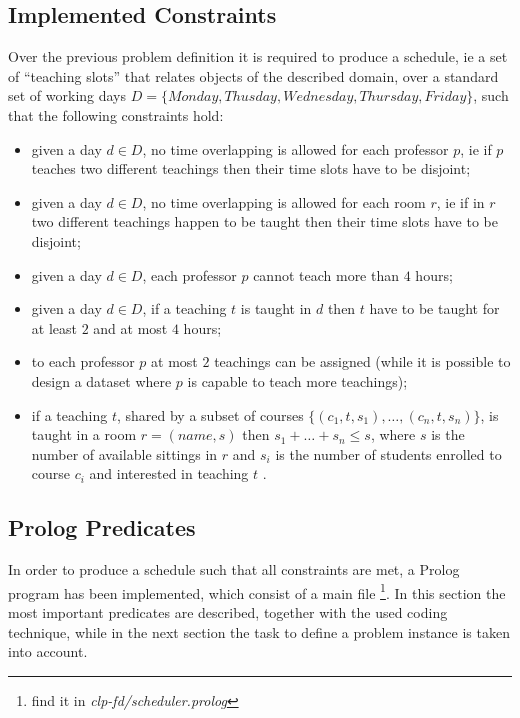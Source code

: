 \documentclass[10pt,a4paper]{article} %
\begin{document}
    \subsection{Implemented Constraints}
    Over the previous problem definition it is required to produce a
    schedule, ie a set of ``teaching slots'' that relates
    objects of the described domain, over a standard set of
    working days $D = \lbrace Monday, Thusday, Wednesday, Thursday, Friday \rbrace$,
    such that the following constraints hold:
    \begin{itemize}
        \item given a day $d \in D$, no time overlapping is allowed
            for each professor $p$,
            ie if $p$ teaches two different teachings then their time slots
            have to be disjoint;
        \item given a day $d \in D$, no time overlapping is allowed
            for each room $r$,
            ie if in $r$ two different teachings happen to be taught then
            their time slots have to be disjoint;
        \item given a day $d \in D$, each professor $p$ cannot teach more than
           $4$ hours;
        \item given a day $d \in D$, if a teaching $t$ is taught in $d$ then
            $t$ have to be taught for at least $2$ and at most $4$ hours;
        \item to each professor $p$ at most $2$ teachings can be assigned
            (while it is possible to design a dataset where $p$ is capable
            to teach more teachings);
        \item if a teaching $t$, shared by a subset of courses
            $\lbrace (c_1, t, s_1), \ldots, (c_n, t, s_n)\rbrace$,
            is taught in a room $r = (name, s)$ then $s_1 + \ldots + s_n \leq s$,
            where $s$ is the number of available sittings in $r$ and
            $s_i$ is the number of students enrolled
            to course $c_i$ and interested in teaching $t$ .
    \end{itemize}

    \subsection{Prolog Predicates}
    In order to produce a schedule such that all constraints are met,
    a Prolog program has been implemented, which consist of a main file \footnote{
       find it in \emph{clp-fd/scheduler.prolog}}. In this section the most
    important predicates are described, together with the used coding technique,
    while in the next section the task to define a problem instance is taken into
    account.
\end{document}
